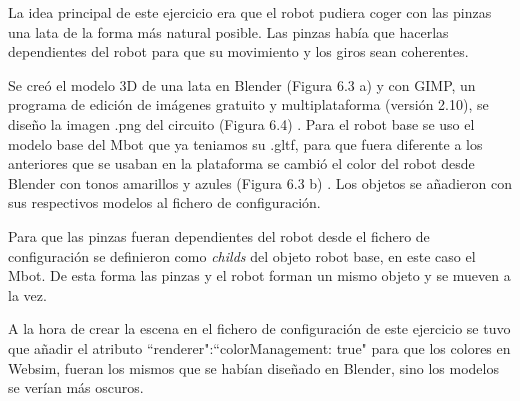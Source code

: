 La idea principal de este ejercicio era que el robot pudiera coger con las pinzas una lata de la forma más natural posible. Las pinzas había que hacerlas dependientes del robot para que su movimiento y los giros sean coherentes. 

Se creó el modelo 3D de una lata en Blender (Figura 6.3 a) y con  GIMP, un programa de edición de imágenes gratuito y multiplataforma (versión 2.10), se diseño la imagen .png del circuito (Figura 6.4) . Para el robot base se uso el modelo base del Mbot que ya teniamos su  .gltf, para que fuera diferente a los anteriores que se usaban en la plataforma se cambió el color del robot desde Blender con tonos amarillos y azules (Figura 6.3 b) .
Los objetos se añadieron con sus respectivos modelos al fichero de configuración.

Para que las pinzas fueran dependientes del robot desde el fichero de configuración se definieron como \textit{childs} del objeto robot base, en este caso el Mbot. De esta forma las pinzas y el robot forman un mismo objeto y se mueven a la vez.

A la hora de crear la escena en el fichero de configuración de este ejercicio se tuvo que añadir el atributo ``renderer":``colorManagement: true"  para que los colores en Websim, fueran los mismos que se habían diseñado en Blender, sino los modelos se verían más oscuros. 

